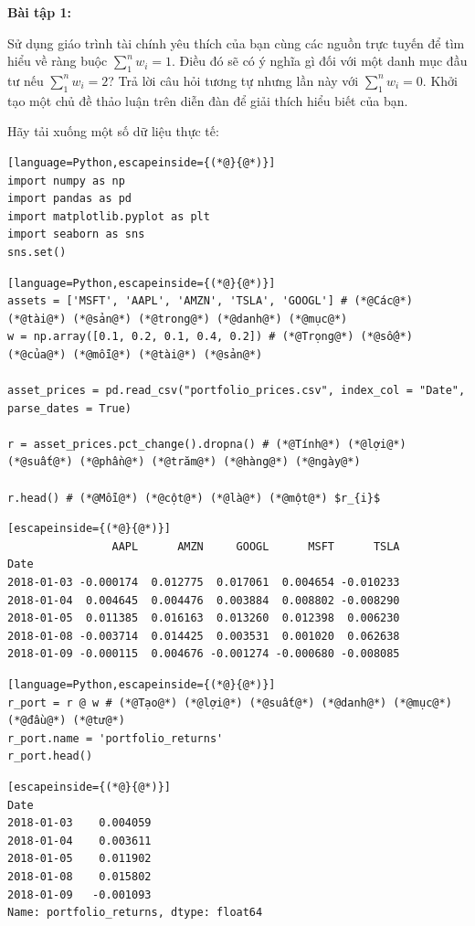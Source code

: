 \textbf{Bài tập 1:}

Sử dụng giáo trình tài chính yêu thích của bạn cùng các nguồn trực tuyến để tìm hiểu về ràng buộc $\sum_{1}^{n} w_{i} = 1$. Điều đó sẽ có ý nghĩa gì đối với một danh mục đầu tư nếu $\sum_{1}^{n} w_{i} = 2$? Trả lời câu hỏi tương tự nhưng lần này với $\sum_{1}^{n} w_{i} = 0$. Khởi tạo một chủ đề thảo luận trên diễn đàn để giải thích hiểu biết của bạn.

Hãy tải xuống một số dữ liệu thực tế:

\begin{lstlisting}[language=Python,escapeinside={(*@}{@*)}]
import numpy as np
import pandas as pd
import matplotlib.pyplot as plt
import seaborn as sns
sns.set()
\end{lstlisting}

\begin{lstlisting}[language=Python,escapeinside={(*@}{@*)}]
assets = ['MSFT', 'AAPL', 'AMZN', 'TSLA', 'GOOGL'] # (*@Các@*) (*@tài@*) (*@sản@*) (*@trong@*) (*@danh@*) (*@mục@*)
w = np.array([0.1, 0.2, 0.1, 0.4, 0.2]) # (*@Trọng@*) (*@số@*) (*@của@*) (*@mỗi@*) (*@tài@*) (*@sản@*)

asset_prices = pd.read_csv("portfolio_prices.csv", index_col = "Date", parse_dates = True)

r = asset_prices.pct_change().dropna() # (*@Tính@*) (*@lợi@*) (*@suất@*) (*@phần@*) (*@trăm@*) (*@hàng@*) (*@ngày@*)

r.head() # (*@Mỗi@*) (*@cột@*) (*@là@*) (*@một@*) $r_{i}$
\end{lstlisting}

\begin{lstlisting}[escapeinside={(*@}{@*)}]
                AAPL      AMZN     GOOGL      MSFT      TSLA
Date
2018-01-03 -0.000174  0.012775  0.017061  0.004654 -0.010233
2018-01-04  0.004645  0.004476  0.003884  0.008802 -0.008290
2018-01-05  0.011385  0.016163  0.013260  0.012398  0.006230
2018-01-08 -0.003714  0.014425  0.003531  0.001020  0.062638
2018-01-09 -0.000115  0.004676 -0.001274 -0.000680 -0.008085
\end{lstlisting}

\begin{lstlisting}[language=Python,escapeinside={(*@}{@*)}]
r_port = r @ w # (*@Tạo@*) (*@lợi@*) (*@suất@*) (*@danh@*) (*@mục@*) (*@đầu@*) (*@tư@*)
r_port.name = 'portfolio_returns'
r_port.head()
\end{lstlisting}

\begin{lstlisting}[escapeinside={(*@}{@*)}]
Date
2018-01-03    0.004059
2018-01-04    0.003611
2018-01-05    0.011902
2018-01-08    0.015802
2018-01-09   -0.001093
Name: portfolio_returns, dtype: float64
\end{lstlisting}

